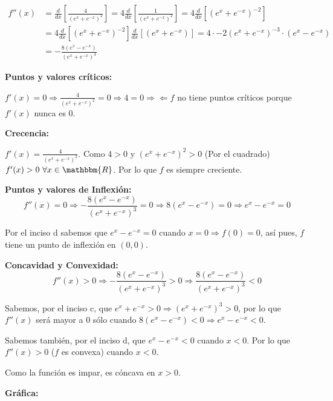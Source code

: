 \documentclass[12pt]{article}
\begin{document}
\begin{enumerate}[\hspace{9px} a)]
            \begin{align*}
                f''(x) &= \frac{d}{dx}\left[\frac{4}{(e^x+e^{-x})^2}\right] = 4\frac{d}{dx}\left[\frac{1}{(e^x+e^{-x})^2}\right] = 4 \frac{d}{dx}\left[(e^x+e^{-x})^{-2}\right]\\
                &= 4\frac{d}{dx}\left[(e^x+e^{-x})^{-2}\right]\frac{d}{dx}\left[(e^x+e^{-x})\right] = 4\cdot-2(e^x+e^{-x})^{-3}\cdot(e^x-e^{-x})\\
                &= -\frac{8(e^x-e^{-x})}{(e^x+e^{-x})^3}
            \end{align*}

        \textbf{Puntos y valores cr\'iticos: }\medskip

            \(f'(x)=0 \Longrightarrow \frac{4}{(e^x+e^{-x})^2}=0 \Longrightarrow 4=0\Rightarrow\!\Leftarrow\)\quad \(f\) no tiene puntos cr\'iticos porque \(f'(x)\) nunca es 0.\medskip

        \textbf{Crecencia: }\medskip

            \(f'(x)=\frac{4}{(e^x+e^{-x})^2}\). Como $4>0$ y $(e^x+e^{-x})^2>0$ (Por el cuadrado) \(f'(x)>0 \ \forall x\in \mathbbm{R}\). Por lo que $f$ es siempre creciente.\medskip

        \textbf{Puntos y valores de Inflexi\'on: }
            \[f''(x)=0 \Longrightarrow -\frac{8(e^x-e^{-x})}{(e^x+e^{-x})^3}=0 \Longrightarrow 8(e^x-e^{-x})=0 \Longrightarrow e^x-e^{-x}=0\]

            Por el inciso d sabemos que \(e^x-e^{-x}=0\) cuando \(x=0 \Longrightarrow f(0)=0\), as\'i pues, $f$ tiene un punto de inflexi\'on en \((0,0)\).\medskip

        \textbf{Concavidad y Convexidad: }\medskip
            \[f''(x)>0 \Longrightarrow -\frac{8(e^x-e^{-x})}{(e^x+e^{-x})^3}>0 \Longrightarrow \frac{8(e^x-e^{-x})}{(e^x+e^{-x})^3}<0\]

            Sabemos, por el inciso c, que \(e^x+e^{-x}>0 \Longrightarrow (e^x+e^{-x})^3>0\), por lo que \(f''(x)\) ser\'a mayor a 0 s\'olo cuando \(8(e^x-e^{-x})<0 \Longrightarrow e^x-e^{-x}<0\).\medskip

            Sabemos tambi\'en, por el inciso d, que \(e^x-e^{-x}<0\) cuando \(x<0\). Por lo que \(f''(x)>0\) ($f$ es convexa) cuando \(x<0\).\medskip

            Como la funci\'on es impar, es c\'oncava en \(x>0\).\medskip

        \textbf{Gr\'afica: }

\end{enumerate}
\end{document}
